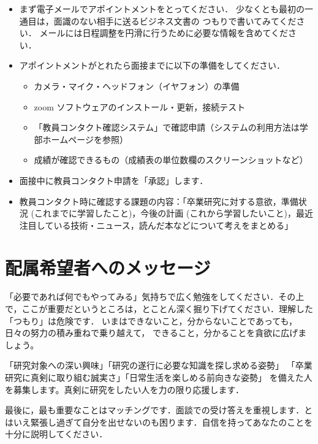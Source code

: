 \documentclass[uplatex,jis2004,a4paper]{jsarticle}
\begin{document}
\begin{itemize}
  \item まず電子メールでアポイントメントをとってください．
    少なくとも最初の一通目は，面識のない相手に送るビジネス文書の
    つもりで書いてみてください．
    メールには日程調整を円滑に行うために必要な情報を含めてください．
  \item アポイントメントがとれたら面接までに以下の準備をしてください．
    \begin{itemize}
      \item カメラ・マイク・ヘッドフォン（イヤフォン）の準備
      \item zoom ソフトウェアのインストール・更新，接続テスト
      \item 「教員コンタクト確認システム」で確認申請（システムの利用方法は学部ホームページを参照）
      \item 成績が確認できるもの（成績表の単位数欄のスクリーンショットなど）
    \end{itemize}
  \item 面接中に教員コンタクト申請を「承認」します．
  \item 教員コンタクト時に確認する課題の内容：「卒業研究に対する意欲，準備状況 (これまでに学習したこと)，今後の計画 (これから学習したいこと)，最近注目している技術・ニュース，読んだ本などについて考えをまとめる」
\end{itemize}

\section{配属希望者へのメッセージ}

「必要であれば何でもやってみる」気持ちで広く勉強をしてください．その上で，ここが重要だというところは，とことん深く掘り下げてください．理解した「つもり」は危険です．
いまはできないこと，分からないことであっても，日々の努力の積み重ねで乗り越えて，
できること，分かることを貪欲に広げましょう。

「研究対象への深い興味」「研究の遂行に必要な知識を探し求める姿勢」
「卒業研究に真剣に取り組む誠実さ」「日常生活を楽しめる前向きな姿勢」
を備えた人を募集します。真剣に研究をしたい人を力の限り応援します．

最後に，最も重要なことはマッチングです．面談での受け答えを重視します．とはいえ緊張し過ぎて自分を出せないのも困ります．自信を持ってあなたのことを十分に説明してください．

%
%
\end{document}

